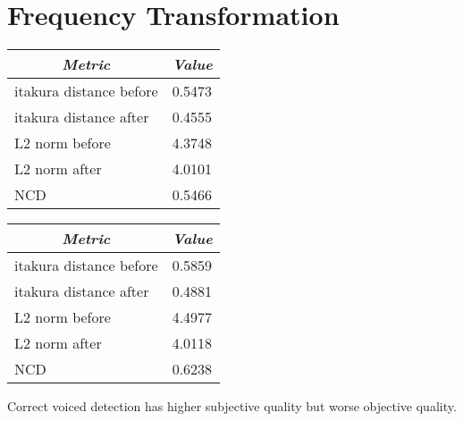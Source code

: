 \section{Frequency Transformation} %
\label{sec:frequency_transformation}

\begin{table}[ht]
	\begin{center}
		\begin{tabular}{ll}
			\toprule
			\multicolumn{1}{c}{\emph{Metric}} & \multicolumn{1}{c}{\emph{Value}} \\
			\midrule
			itakura distance before & 0.5473 \\
			itakura distance after & 0.4555 \\
			L2 norm before & 4.3748\\
			L2 norm after & 4.0101 \\
			NCD & 0.5466 \\
			\bottomrule			
		\end{tabular}		
	\end{center}
\label{tab:frequency_transform_for_unvoiced_frames}	
\end{table}

\begin{table}[ht]
	\begin{center}
		\begin{tabular}{ll}
			\toprule
			\multicolumn{1}{c}{\emph{Metric}} & \multicolumn{1}{c}{\emph{Value}} \\
			\midrule
			itakura distance before & 0.5859 \\
			itakura distance after & 0.4881 \\
			L2 norm before & 4.4977\\
			L2 norm after & 4.0118 \\
			NCD & 0.6238 \\
			\bottomrule			
		\end{tabular}		
	\end{center}
\label{tab:frequency_transform_for_unvoiced_frames}	
\end{table}

Correct voiced detection has higher subjective quality but worse objective quality.

